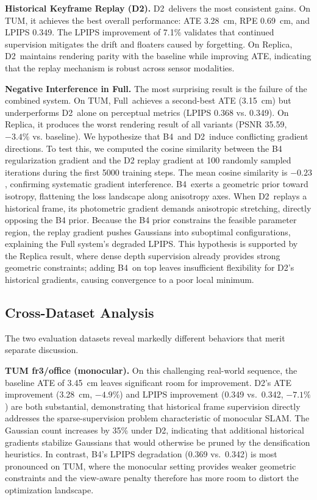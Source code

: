 \documentclass[conference]{IEEEtran}
\begin{document}
\textbf{Historical Keyframe Replay ({D2}).}
{D2}~delivers the most consistent gains.
On TUM, it achieves the best overall performance: ATE 3.28~cm, RPE 0.69~cm, and LPIPS 0.349.
The LPIPS improvement of 7.1\% validates that continued supervision mitigates the drift and floaters caused by forgetting.
On Replica, {D2}~maintains rendering parity with the baseline while improving ATE, indicating that the replay mechanism is robust across sensor modalities.

\textbf{Negative Interference in Full.}
The most surprising result is the failure of the combined system.
On TUM, Full~achieves a second-best ATE (3.15~cm) but underperforms {D2}~alone on perceptual metrics (LPIPS 0.368 vs. 0.349).
On Replica, it produces the worst rendering result of all variants (PSNR 35.59, $-3.4\%$ vs. baseline).
We hypothesize that {B4}~and {D2}~induce conflicting gradient directions. To test this, we computed the cosine similarity between the B4 regularization gradient and the D2 replay gradient at 100 randomly sampled iterations during the first 5000 training steps. The mean cosine similarity is $-0.23$, confirming systematic gradient interference.
{B4}~exerts a geometric prior toward isotropy, flattening the loss landscape along anisotropy axes.
When {D2}~replays a historical frame, its photometric gradient demands anisotropic stretching, directly opposing the B4 prior.
Because the B4 prior constrains the feasible parameter region, the replay gradient pushes Gaussians into suboptimal configurations, explaining the Full system\textquoteright s degraded LPIPS.
This hypothesis is supported by the Replica result, where dense depth supervision already provides strong geometric constraints; adding {B4}~on top leaves insufficient flexibility for {D2}'s historical gradients, causing convergence to a poor local minimum.

\subsection{Cross-Dataset Analysis}
\label{sec:cross_dataset}

The two evaluation datasets reveal markedly different behaviors that merit separate discussion.

\textbf{TUM fr3/office (monocular).}
On this challenging real-world sequence, the baseline ATE of 3.45~cm leaves significant room for improvement.
{D2}'s ATE improvement (3.28~cm, $-4.9\%$) and LPIPS improvement (0.349 vs.~0.342, $-7.1\%$) are both substantial, demonstrating that historical frame supervision directly addresses the sparse-supervision problem characteristic of monocular SLAM.
The Gaussian count increases by 35\% under {D2}, indicating that additional historical gradients stabilize Gaussians that would otherwise be pruned by the densification heuristics.
In contrast, {B4}'s LPIPS degradation (0.369 vs.~0.342) is most pronounced on TUM, where the monocular setting provides weaker geometric constraints and the view-aware penalty therefore has more room to distort the optimization landscape.
\end{document}
